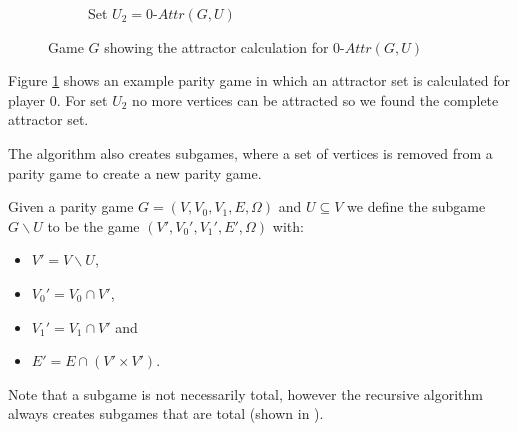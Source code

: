 \begin{figure}
\begin{subfigure}{1\textwidth}
		\caption{Set $U_2 = 0\textit{-Attr}(G,U)$}
	\end{subfigure}
	\caption{Game $G$ showing the attractor calculation for $0\textit{-Attr}(G,U)$}
	\label{fig:AttrCalcExample}
\end{figure}
\begin{example}
	Figure \ref{fig:AttrCalcExample} shows an example parity game in which an attractor set is calculated for player $0$. For set $U_2$ no more vertices can be attracted so we found the complete attractor set.
\end{example}

The algorithm also creates subgames, where a set of vertices is removed from a parity game to create a new parity game.

\begin{definition}
	\label{def_org_subgame}
	Given a parity game $G = (V,V_0,V_1, E,\Omega)$ and $U \subseteq V$ we define the subgame $G \backslash U$ to be the game $(V', V_0', V_1', E', \Omega)$ with:
	\begin{itemize}
		\item $V' = V \backslash U$,
		\item $V_0' = V_0 \cap V'$,
		\item $V_1' = V_1 \cap V'$ and
		\item $E' = E \cap (V' \times V')$.
	\end{itemize}
\end{definition}

Note that a subgame is not necessarily total, however the recursive algorithm always creates subgames that are total (shown in \cite{ZIELONKA1998135}).

